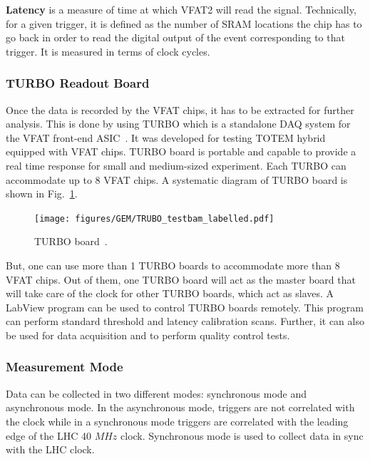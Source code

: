 \textbf{Latency} is a measure of time at which VFAT2 will read the signal. Technically, for a given trigger, it is defined as the number of SRAM locations the chip has to go back in order to read the digital output of the event corresponding to that trigger. It is measured in terms of clock cycles. 

\subsubsection{TURBO Readout Board} %
\label{ssub:turbo_readout_board}
Once the data is recorded by the VFAT chips, it has to be extracted for further analysis.
This is done by using TURBO which is a standalone DAQ system for the VFAT front-end ASIC~\cite{Paschalis2011}.
It was developed for testing TOTEM hybrid equipped with VFAT chips.
TURBO board is portable and capable to provide a real time response for small and medium-sized experiment.
Each TURBO can accommodate up to 8 VFAT chips. 
A systematic diagram of TURBO board is shown in Fig.~\ref{fig:turbo}.
\begin{figure}[!htbp]
    \centering
    \texttt{[image: figures/GEM/TRUBO\_testbam\_labelled.pdf]}
    \caption{TURBO board~\cite{Paschalis2011}.}
    \label{fig:turbo}
\end{figure}
But, one can use more than 1 TURBO boards to accommodate more than 8 VFAT chips. 
Out of them, one TURBO board will act as the master board that will take care of the clock for other TURBO boards, which act as slaves.
A LabView program can be used to control TURBO boards remotely.
This program can perform standard threshold and latency calibration scans. Further, it can also be used for data acquisition and to perform quality control tests.


\subsubsection{Measurement Mode} %
\label{ssub:measurement_mode}
Data can be collected in two different modes: synchronous mode and asynchronous mode. In the asynchronous mode, triggers are not correlated with the clock while in a synchronous mode triggers are correlated with the leading edge of the LHC 40 $MHz$ clock. Synchronous mode is used to collect data in sync with the LHC clock.

